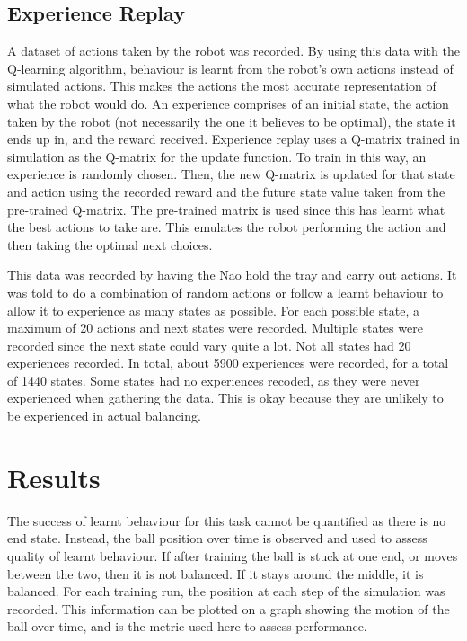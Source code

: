 \documentclass[12pt,a4paper]{article}
\begin{document}

\subsection{Experience Replay}
A dataset of actions taken by the robot was recorded. By using this data with the Q-learning algorithm, behaviour is learnt from the robot’s own actions instead of simulated actions. This makes the actions the most accurate representation of what the robot would do. An experience comprises of an initial state, the action taken by the robot (not necessarily the one it believes to be optimal), the state it ends up in, and the reward received. Experience replay uses a Q-matrix trained in simulation as the Q-matrix for the update function. To train in this way, an experience is randomly chosen. Then, the new Q-matrix is updated for that state and action using the recorded reward and the future state value taken from the pre-trained Q-matrix. The pre-trained matrix is used since this has learnt what the best actions to take are. This emulates the robot performing the action and then taking the optimal next choices. 

This data was recorded by having the Nao hold the tray and carry out actions. It was told to do a combination of random actions or follow a learnt behaviour to allow it to experience as many states as possible. For each possible state, a maximum of 20 actions and next states were recorded. Multiple states were recorded since the next state could vary quite a lot. Not all states had 20 experiences recorded. In total, about 5900 experiences were recorded, for a total of 1440 states. Some states had no experiences recoded, as they were never experienced when gathering the data. This is okay because they are unlikely to be experienced in actual balancing. 


\section{Results}
The success of learnt behaviour for this task cannot be quantified as there is no end state. Instead, the ball position over time is observed and used to assess quality of learnt behaviour. If after training the ball is stuck at one end, or moves between the two, then it is not balanced. If it stays around the middle, it is balanced. For each training run, the position at each step of the simulation was recorded. This information can be plotted on a graph showing the motion of the ball over time, and is the metric used here to assess performance. 
\end{document}
